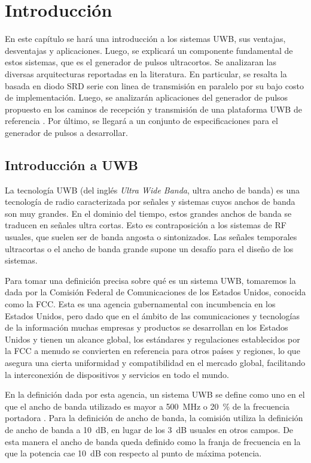 \chapter{Introducción}

En este capítulo se hará una introducción a los sistemas UWB, sus ventajas,
desventajas y aplicaciones. Luego, se explicará un componente fundamental de
estos sistemas, que es el generador de pulsos ultracortos. Se analizaran las
diversas arquitecturas reportadas en la literatura. En particular, se resalta la
basada en diodo SRD serie con linea de transmisión en paralelo por su bajo costo
de implementación. Luego, se analizarán aplicaciones del generador de pulsos
propuesto en los caminos de recepción y transmisión de una plataforma UWB de
referencia \cite{Altieri2021}. Por último, se llegará a un conjunto de
especificaciones para el generador de pulsos a desarrollar.

\section{Introducción a UWB}

La tecnología UWB (del inglés \textit{Ultra Wide Banda}, ultra ancho de banda) es una
tecnología de radio caracterizada por señales y sistemas cuyos anchos de banda son muy
grandes. En el dominio del tiempo, estos grandes anchos de banda se traducen en
señales ultra cortas. Esto es contraposición a los sistemas de RF usuales, que
suelen ser de banda angosta o sintonizados. Las señales temporales ultracortas o
el ancho de banda grande supone un desafío para el diseño de los sistemas.

Para tomar una definición precisa sobre qué es un sistema UWB, tomaremos la dada
por la Comisión Federal de Comunicaciones de los Estados Unidos, conocida como
la FCC. Esta es una agencia gubernamental con incumbencia en los Estados Unidos,
pero dado que en el ámbito de las comunicaciones y tecnologías de la información
muchas empresas y productos se desarrollan en los Estados Unidos y tienen un
alcance global, los estándares y regulaciones establecidos por la FCC a menudo
se convierten en referencia para otros países y regiones, lo que asegura una
cierta uniformidad y compatibilidad en el mercado global, facilitando la
interconexión de dispositivos y servicios en todo el mundo.

En la definición dada por esta agencia, un sistema UWB se
define como uno en el que el ancho de banda utilizado es mayor a
\qty{500}{\mega\hertz} o \qty{20}{\percent} de la frecuencia portadora
\cite{FCC_UWB}. Para la definición de ancho de banda, la comisión utiliza la
definición de ancho de banda a \qty{10}{\dB}, en lugar de los \qty{3}{\dB}
usuales en otros campos. De esta manera el ancho de banda queda definido como la
franja de frecuencia en la que la potencia cae \qty{10}{\dB} con respecto al
punto de máxima potencia.

